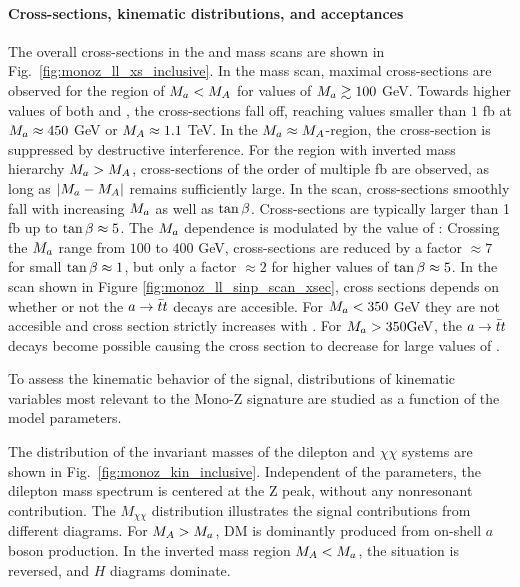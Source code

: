\paragraph{Cross-sections, kinematic distributions, and acceptances}
The overall cross-sections in the \tanb and mass scans are shown in Fig.~\ref{fig:monoz_ll_xs_inclusive}.
In the mass scan, maximal cross-sections are observed for the region of $M_{a} < M_{A}$ for values of $M_{a}\gtrsim100$ GeV. Towards higher values of both \ma and \mA, the cross-sections fall off, reaching values smaller than $1$ fb at $M_{a}\approx450$ GeV or $M_{A}\approx1.1$ TeV. In the $M_{a}\approx M_{A}$-region, the cross-section is suppressed by destructive interference. For the region with inverted mass hierarchy $M_{a}>M_{A}$, cross-sections of the order of multiple fb are observed, as long as $|M_{a}-M_{A}|$ remains sufficiently large.
In the \tanb scan, cross-sections smoothly fall with increasing $M_{a}$ as well as $\tan\beta$. Cross-sections are typically larger than 1 fb up to $\tan\beta\approx5$. The $M_{a}$ dependence is modulated by the value of \tanb: Crossing the $M_{a}$ range from $100$ to $400$ GeV, cross-sections are reduced by a factor $\approx7$ for small $\tan\beta\approx1$, but only a factor $\approx2$ for higher values of $\tan\beta\approx5$.
In the \sinp scan shown in Figure \ref{fig:monoz_ll_sinp_scan_xsec}, cross sections depends on whether or not the $a \rightarrow \bar{t}t$ decays are accesible.  
For $M_{a} < 350$ GeV they are not accesible and cross section strictly increases with \sinp.  For $M_{a} > 350 \textrm{GeV}$, the $a \rightarrow \bar{t}t$ decays become possible causing the cross section to decrease for large values of \sinp.


To assess the kinematic behavior of the signal, distributions of kinematic variables most relevant to the Mono-Z signature are studied as a function of the model parameters.

The distribution of the invariant masses of the dilepton and $\chi\chi$ systems are shown in Fig.~\ref{fig:monoz_kin_inclusive}. Independent of the parameters, the dilepton mass spectrum is centered at the Z peak, without any nonresonant contribution. The $M_{\chi\chi}$ distribution illustrates the signal contributions from different diagrams. For $M_{A}>M_{a}$, DM is dominantly produced from on-shell $a$ boson production. In the inverted mass region $M_{A}<M_{a}$, the situation is reversed, and $H$ diagrams dominate.


